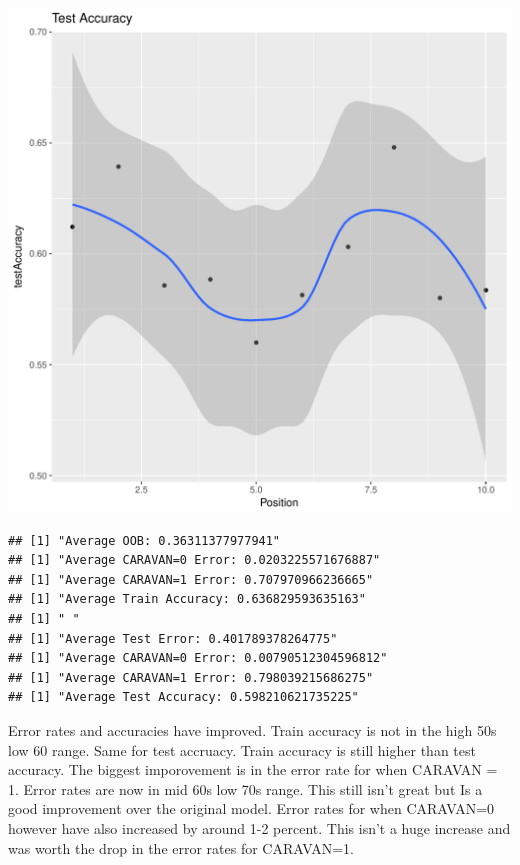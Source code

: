 \documentclass{article}\usepackage[]{graphicx}\usepackage[]{color}
\makeatletter
\def\maxwidth{ %
  \ifdim\Gin@nat@width>\linewidth
    \linewidth
  \else
    \Gin@nat@width
  \fi
}
\newenvironment{kframe}{%
 \def\at@end@of@kframe{}%
 \ifinner\ifhmode%
  \def\at@end@of@kframe{\end{minipage}}%
  \begin{minipage}{\columnwidth}%
 \fi\fi%
 \def\FrameCommand##1{\hskip\@totalleftmargin \hskip-\fboxsep
 \colorbox{shadecolor}{##1}\hskip-\fboxsep
     \hskip-\linewidth \hskip-\@totalleftmargin \hskip\columnwidth}%
 \MakeFramed {\advance\hsize-\width
   \@totalleftmargin\z@ \linewidth\hsize
   \@setminipage}}%
 {\par\unskip\endMakeFramed%
 \at@end@of@kframe}
\newenvironment{knitrout}{}{} %
\makeatother
\begin{document}
\begin{knitrout}
\begin{kframe}
{\ttfamily\noindent\itshape\color{messagecolor}{\#\# `geom\_smooth()` using method = 'loess'}}\end{kframe}
\includegraphics[width=\maxwidth]{figure/unnamed-chunk-39-8} 
\begin{kframe}\begin{verbatim}
## [1] "Average OOB: 0.36311377977941"
## [1] "Average CARAVAN=0 Error: 0.0203225571676887"
## [1] "Average CARAVAN=1 Error: 0.707970966236665"
## [1] "Average Train Accuracy: 0.636829593635163"
## [1] " "
## [1] "Average Test Error: 0.401789378264775"
## [1] "Average CARAVAN=0 Error: 0.00790512304596812"
## [1] "Average CARAVAN=1 Error: 0.798039215686275"
## [1] "Average Test Accuracy: 0.598210621735225"
\end{verbatim}
\end{kframe}
\end{knitrout}
Error rates and accuracies have improved. Train accuracy is not in the high 50s low 60 range. Same for test accruacy. Train accuracy is still higher than test accuracy. The biggest imporovement is in the error rate for when CARAVAN = 1. Error rates are now in mid 60s low 70s range. This still isn't great but Is a good improvement over the original model. Error rates for when CARAVAN=0 however have also increased by around 1-2 percent. This isn't a huge increase and was worth the drop in the error rates for CARAVAN=1. 
\end{document}
